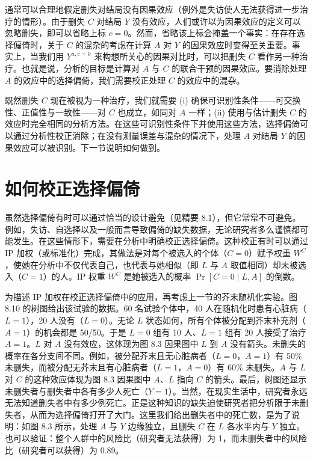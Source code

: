 通常可以合理地假定删失对结局没有因果效应（例外是失访使人无法获得进一步治疗的情形）。由于删失 $C$ 对结局 $Y$ 没有效应，人们或许以为因果效应的定义可以忽略删失，即可以省略上标 $c=0$。然而，省略该上标会掩盖一个事实：在存在选择偏倚时，关于 $C$ 的混杂的考虑在计算 $A$ 对 $Y$ 的因果效应时变得至关重要。事实上，当我们用 $Y^{a,c=0}$ 来构想所关心的因果对比时，可以把删失 $C$ 看作另一种治疗。也就是说，分析的目标是计算对 $A$ 与 $C$ 的联合干预的因果效应。要消除处理 $A$ 的效应中的选择偏倚，我们需要校正处理 $C$ 的效应中的混杂。

既然删失 $C$ 现在被视为一种治疗，我们就需要 (i) 确保可识别性条件——可交换性、正值性与一致性——对 $C$ 也成立，如同对 $A$ 一样；(ii) 使用与估计删失 $C$ 的效应时完全相同的分析方法。在这些可识别性条件下并使用这些方法，选择偏倚可以通过分析性校正消除；在没有测量误差与混杂的情况下，处理 $A$ 对结局 $Y$ 的因果效应可以被识别。下一节说明如何做到。

\section{如何校正选择偏倚}

虽然选择偏倚有时可以通过恰当的设计避免（见精要 8.1），但它常常不可避免。例如，失访、自选择以及一般而言导致偏倚的缺失数据，无论研究者多么谨慎都可能发生。在这些情形下，需要在分析中明确校正选择偏倚。这种校正有时可以通过 IP 加权（或标准化）完成，其做法是对每个被选入的个体（$C=0$）赋予权重 $W^C$，使她在分析中不仅代表自己，也代表与她相似（即 $L$ 与 $A$ 取值相同）却未被选入（$C=1$）的人。IP 权重 $W^C$ 是她被选入的概率 $\Pr[C=0\mid L,A]$ 的倒数。

为描述 IP 加权在校正选择偏倚中的应用，再考虑上一节的芥末随机化实验。图 8.10 的树图给出该试验的数据。60 名试验个体中，40 人在随机化时患有心脏病（$L=1$），20 人没有（$L=0$）。无论 $L$ 状态如何，所有个体被分配到芥末补充剂（$A=1$）的机会都是 50/50。于是 $L=0$ 组有 10 人、$L=1$ 组有 20 人接受了治疗 $A=1$。$L$ 对 $A$ 没有效应，这体现为图 8.3 因果图中 $L$ 到 $A$ 没有箭头。未删失的概率在各分支间不同。例如，被分配芥末且无心脏病者（$L=0$，$A=1$）有 50\% 未删失，而被分配无芥末且有心脏病者（$L=1$，$A=0$）有 60\% 未删失。$A$ 与 $L$ 对 $C$ 的这种效应体现为图 8.3 因果图中 $A$、$L$ 指向 $C$ 的箭头。最后，树图还显示未删失者与删失者中各有多少人死亡（$Y=1$）。当然，在现实生活中，研究者永远无法知道删失者中有多少例死亡。正是这种知识的缺失迫使研究者把分析限于未删失者，从而为选择偏倚打开了大门。这里我们给出删失者中的死亡数，是为了说明：如图 8.3 所示，处理 $A$ 与 $Y$ 边缘独立，且删失 $C$ 在 $L$ 各水平内与 $Y$ 独立。也可以验证：整个人群中的风险比（研究者无法获得）为 1，而未删失者中的风险比（研究者可以获得）为 0.89。

